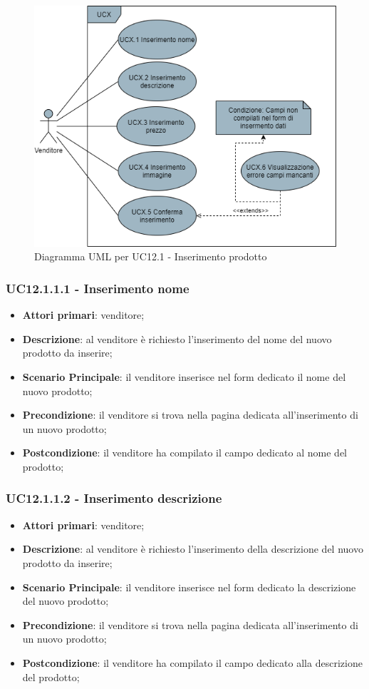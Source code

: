 \begin{figure}[H]
\centering
\includegraphics[scale=0.6]{res/UseCase/Immagini/InserimentoProdotto}
\caption{Diagramma UML per UC12.1 - Inserimento prodotto}
\end{figure}

\subsubsection{UC12.1.1.1 - Inserimento nome}
\begin{itemize}
\item \textbf{Attori primari}: venditore;
\item \textbf{Descrizione}: al venditore è richiesto l'inserimento del nome del nuovo prodotto da inserire;
\item \textbf{Scenario Principale}: il venditore inserisce nel form dedicato il nome del nuovo prodotto;
\item \textbf{Precondizione}: il venditore si trova nella pagina dedicata all'inserimento di un nuovo prodotto;
\item \textbf{Postcondizione}: il venditore ha compilato il campo dedicato al nome del prodotto;
\end{itemize}

\subsubsection{UC12.1.1.2 - Inserimento descrizione}
\begin{itemize}
\item \textbf{Attori primari}: venditore;
\item \textbf{Descrizione}: al venditore è richiesto l'inserimento della descrizione del nuovo prodotto da inserire;
\item \textbf{Scenario Principale}: il venditore inserisce nel form dedicato la descrizione del nuovo prodotto;
\item \textbf{Precondizione}: il venditore si trova nella pagina dedicata all'inserimento di un nuovo prodotto;
\item \textbf{Postcondizione}: il venditore ha compilato il campo dedicato alla descrizione del prodotto;
\end{itemize}

